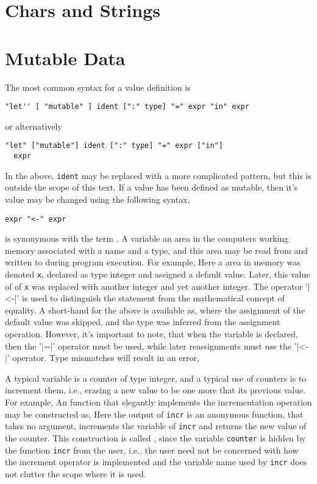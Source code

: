 \section{Chars and Strings}


\section{Mutable Data}
\label{sec:mutableValues}
The most common syntax for a value definition is
\begin{lstlisting}[language=EBNF]
"let'' [ "mutable" ] ident [":" type] "=" expr "in" expr
\end{lstlisting}
or alternatively
\begin{lstlisting}[language=EBNF]
"let" ["mutable"] ident [":" type] "=" expr ["in"]
  expr
\end{lstlisting}
In the above, \texttt{ident} may be replaced with a more complicated pattern, but this is outside the scope of this text. If a value has been defined as mutable, then it's value may be changed using the following syntax,
\begin{lstlisting}[language=EBNF]
expr "<-" expr
\end{lstlisting}

 is synonymous with the term . A variable an area in the computers working memory associated with a name and a type, and this area may be read from and written to during program execution. For example,
Here a area in memory was denoted \texttt{x}, declared as type integer and assigned a default value.  Later, this value of of \texttt{x} was replaced with another integer and yet another integer. The operator '\token|<-|' is used to distinguish the statement from the mathematical concept of equality. A short-hand for the above is available as,
where the assignment of the default value was skipped, and the type was inferred from the assignment operation. However, it's important to note, that when the variable is declared, then the '\token|=|' operator must be used, while later reassignments must use the '\token|<-|'  operator. Type mismatches will result in an error, 

A typical variable is a counter of type integer, and a typical use of counters is to increment them, i.e., erasing a new value to be one more that its previous value. For example,
An function that elegantly implements the incrementation operation may be constructed as,
 Here the output of \texttt{incr} is an anonymous function, that takes no argument, increments the variable of \texttt{incr} and returns the new value of the counter. This construction is called , since the variable \texttt{counter} is hidden by the function \texttt{incr} from the user, i.e., the user need not be concerned with how the increment operator is implemented and the variable name used by \texttt{incr} does not clutter the scope where it is used.

